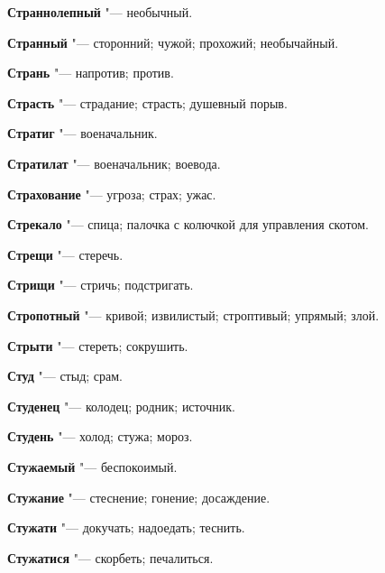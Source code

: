 \begin{mymulticols}{2}
\noindent\textbf{Страннолепный} "--- необычный. 




\noindent\textbf{Странный} "--- сторонний; чужой; прохожий; необычайный. 




\noindent\textbf{Странь} "--- напротив; против. 




\noindent\textbf{Страсть} "--- страдание; страсть; душевный порыв. 




\noindent\textbf{Стратиг} "--- военачальник. 




\noindent\textbf{Стратилат} "--- военачальник; воевода. 




\noindent\textbf{Страхование} "--- угроза; страх; ужас. 




\noindent\textbf{Стрекало} "--- спица; палочка с колючкой для управления скотом. 




\noindent\textbf{Стрещи} "--- стеречь. 




\noindent\textbf{Стрищи} "--- стричь; подстригать. 




\noindent\textbf{Стропотный} "--- кривой; извилистый; строптивый; упрямый; злой. 




\noindent\textbf{Стрыти} "--- стереть; сокрушить. 




\noindent\textbf{Студ} "--- стыд; срам. 




\noindent\textbf{Студенец} "--- колодец; родник; источник. 




\noindent\textbf{Студень} "--- холод; стужа; мороз. 




\noindent\textbf{Стужаемый} "--- беспокоимый. 




\noindent\textbf{Стужание} "--- стеснение; гонение; досаждение. 




\noindent\textbf{Стужати} "--- докучать; надоедать; теснить. 




\noindent\textbf{Стужатися} "--- скорбеть; печалиться. 





\end{mymulticols}
